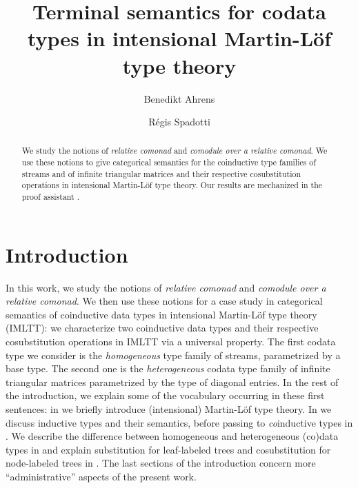 \documentclass[a4paper,USenglish]{lipics}
\title{Terminal semantics for codata types in intensional Martin-L\"of type theory}
\author{Benedikt Ahrens}
\author{R\'egis Spadotti}
\affil{
Institut de Recherche en Informatique de Toulouse\\
Universit\'e Paul Sabatier, 
Toulouse}
\begin{document}
\maketitle


\begin{abstract}
 We study the notions of \emph{relative comonad} and \emph{comodule over a relative comonad}.
 We use these notions to give categorical semantics for the coinductive type families of streams and
 of infinite triangular matrices and their respective cosubstitution operations in intensional Martin-L\"of type theory.
 Our results are mechanized in the proof assistant \coq.
\end{abstract}




\section{Introduction}
 
 In this work, we study the notions of \emph{relative comonad} and \emph{comodule over a relative comonad}.
 We then use these notions for a case study in categorical semantics of coinductive data types in intensional Martin-Löf type theory (IMLTT): 
 we characterize two coinductive data types and their respective cosubstitution operations 
 in IMLTT via a universal property.
 The first codata type we consider is the \emph{homogeneous} type family of streams, parametrized by a base type.
 The second one is the \emph{heterogeneous} codata type family of infinite triangular matrices parametrized by the type of diagonal entries.
  In the rest of the introduction, we explain some of the vocabulary occurring in these first sentences:
  in  we briefly introduce (intensional) Martin-Löf type theory. In  we discuss inductive types and their semantics,
  before passing to \emph{co}inductive types in .
  We describe
  the difference between homogeneous and heterogeneous (co)data types in  and explain substitution for leaf-labeled trees and cosubstitution for node-labeled trees in .
  The last sections of the introduction concern more \enquote{administrative} aspects of the present work.
  
  
\end{document}
